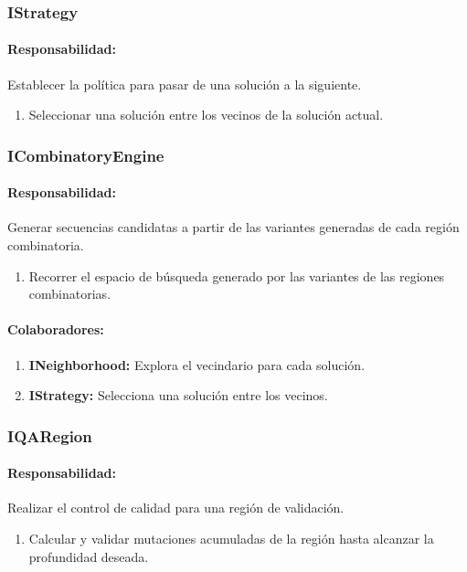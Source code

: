   \subsubsection{IStrategy}
    \paragraph{Responsabilidad:} Establecer la pol\'itica para pasar de una
soluci\'on a la siguiente.
      \begin{enumerate}       
       \item Seleccionar una soluci\'on entre los vecinos de la soluci\'on
actual.
      \end{enumerate}

  \subsubsection{ICombinatoryEngine}
    \paragraph{Responsabilidad:} Generar secuencias candidatas a partir de las
variantes generadas de cada regi\'on combinatoria.   
      \begin{enumerate}       
       \item Recorrer el espacio de b\'usqueda generado por las variantes de
las regiones combinatorias.
      \end{enumerate}
    \paragraph{Colaboradores:}
      \begin{enumerate}
       \item \textbf{INeighborhood:} Explora el vecindario para cada soluci\'on.
       \item \textbf{IStrategy:} Selecciona una soluci\'on entre los vecinos.
      \end{enumerate} 

  \subsubsection{IQARegion}
    \paragraph{Responsabilidad:} Realizar el control de calidad para una
regi\'on de validaci\'on.
      \begin{enumerate}
       \item Calcular y validar mutaciones acumuladas de la regi\'on hasta
alcanzar la profundidad deseada.
      \end{enumerate}
